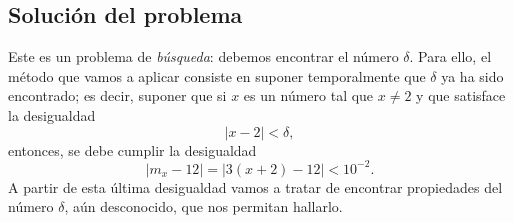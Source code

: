 \subsection{Solución del problema} Este es un problema de \emph{búsqueda}: debemos encontrar el
número $\delta$. Para ello, el método que vamos a aplicar consiste en suponer temporalmente que
$\delta$ ya ha sido encontrado; es decir, suponer que si $x$ es un número tal que $x\neq 2$ y que
satisface la desigualdad
\begin{equation}
\label{eqLim002} |x - 2| < \delta,
\end{equation}
entonces, se debe cumplir la desigualdad
\begin{equation}
\label{eqLim003} |m_x - 12| = |3(x+2) - 12| < 10^{-2}.
\end{equation}
A partir de esta última desigualdad vamos a tratar de encontrar propiedades del número $\delta$,
aún desconocido, que nos permitan hallarlo.

